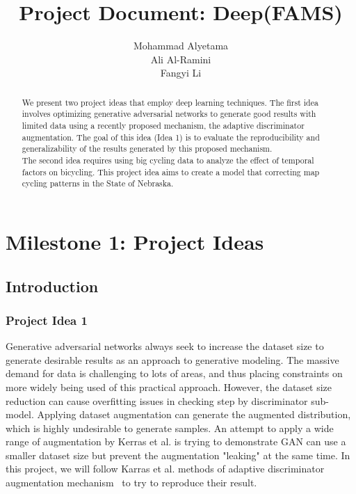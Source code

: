 \documentclass{report}
\title{Project Document: Deep(FAMS)}
\author{Mohammad Alyetama \\
Ali Al-Ramini \\
Fangyi Li }
\date{}
\begin{document}
\maketitle

\tableofcontents

\begin{abstract}
We present two project ideas that employ deep learning techniques. The first idea involves optimizing generative adversarial networks to generate good results with limited data using a recently proposed mechanism, the adaptive discriminator augmentation. The goal of this idea (Idea 1) is to evaluate the reproducibility and generalizability of the results generated by this proposed mechanism. \\The second idea requires using big cycling data to analyze the effect of temporal factors on bicycling. This project idea aims to create a model that correcting map cycling patterns in the State of Nebraska.
\end{abstract}

\chapter{Milestone 1: Project Ideas}

\section{Introduction}

\subsection{Project Idea 1}

Generative adversarial networks always seek to increase the dataset size to generate desirable results as an approach to generative modeling. The massive demand for data is challenging to lots of areas, and thus placing constraints on more widely being used of this practical approach. However, the dataset size reduction can cause overfitting issues in checking step by discriminator sub-model. Applying dataset augmentation can generate the augmented distribution, which is highly undesirable to generate samples.
An attempt to apply a wide range of augmentation by Kerras et al. is trying to demonstrate GAN can use a smaller dataset size but prevent the augmentation "leaking" at the same time. In this project, we will follow Karras et al. methods of adaptive discriminator augmentation mechanism~\cite{karras2020training} to try to reproduce their result.
\end{document}
